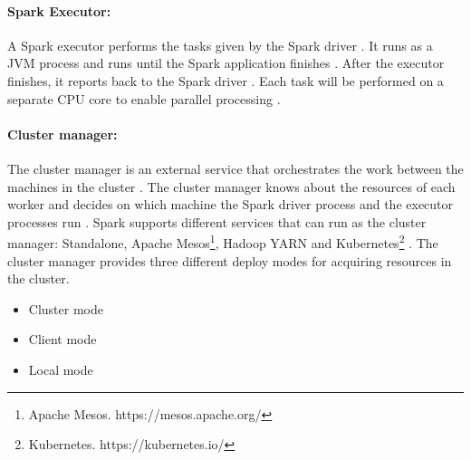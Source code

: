\paragraph{Spark Executor:}
A Spark executor performs the tasks given by the Spark driver \cite{Chambers2018Spark}. It runs as a JVM process and runs until the Spark application finishes \cite{Hien2018Spark}. After the executor finishes, it reports back to the Spark driver \cite{Chambers2018Spark}. Each task will be performed on a separate CPU core to enable parallel processing  \cite{Hien2018Spark}.


\paragraph{Cluster manager:}
The cluster manager is an external service that orchestrates the work between the machines in the cluster \cite{Hien2018Spark, Apache2020Spark}. The cluster manager knows about the resources of each worker and decides on which machine the Spark driver process and the executor processes run \cite{Hien2018Spark, Chambers2018Spark}.
Spark supports different services that can run as the cluster manager: Standalone, Apache Mesos\footnote{Apache Mesos. https://mesos.apache.org/}, Hadoop YARN\cite{Murthy2013Yarn} and Kubernetes\footnote{Kubernetes. https://kubernetes.io/} \cite{Apache2020Spark}.
The cluster manager provides three different deploy modes for acquiring resources in the cluster.
\begin{itemize}
\item Cluster mode
\item Client mode
\item Local mode
\end{itemize}


